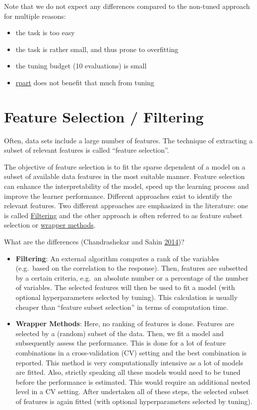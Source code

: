 \documentclass[]{scrbook}
\providecommand{\tightlist}{%
  \setlength{\itemsep}{0pt}\setlength{\parskip}{0pt}}
\begin{document}
Note that we do not expect any differences compared to the non-tuned approach for multiple reasons:

\begin{itemize}
\tightlist
\item
  the task is too easy
\item
  the task is rather small, and thus prone to overfitting
\item
  the tuning budget (10 evaluations) is small
\item
  \href{https://cran.r-project.org/package=rpart}{rpart} does not benefit that much from tuning
\end{itemize}

\hypertarget{fs}{%
\section{Feature Selection / Filtering}\label{fs}}

Often, data sets include a large number of features.
The technique of extracting a subset of relevant features is called ``feature selection''.

The objective of feature selection is to fit the sparse dependent of a model on a subset of available data features in the most suitable manner.
Feature selection can enhance the interpretability of the model, speed up the learning process and improve the learner performance.
Different approaches exist to identify the relevant features.
Two different approaches are emphasized in the literature:
one is called \protect\hyperlink{fs-filtering}{Filtering} and the other approach is often referred to as feature subset selection or \protect\hyperlink{fs-wrapper}{wrapper methods}.

What are the differences (Chandrashekar and Sahin \protect\hyperlink{ref-chandrashekar2014}{2014})?

\begin{itemize}
\tightlist
\item
  \textbf{Filtering}: An external algorithm computes a rank of the variables (e.g.~based on the correlation to the response).
  Then, features are subsetted by a certain criteria, e.g.~an absolute number or a percentage of the number of variables.
  The selected features will then be used to fit a model (with optional hyperparameters selected by tuning).
  This calculation is usually cheaper than ``feature subset selection'' in terms of computation time.
\item
  \textbf{Wrapper Methods}: Here, no ranking of features is done.
  Features are selected by a (random) subset of the data.
  Then, we fit a model and subsequently assess the performance.
  This is done for a lot of feature combinations in a cross-validation (CV) setting and the best combination is reported.
  This method is very computationally intensive as a lot of models are fitted.
  Also, strictly speaking all these models would need to be tuned before the performance is estimated.
  This would require an additional nested level in a CV setting.
  After undertaken all of these steps, the selected subset of features is again fitted (with optional hyperparameters selected by tuning).
\end{itemize}
\end{document}
